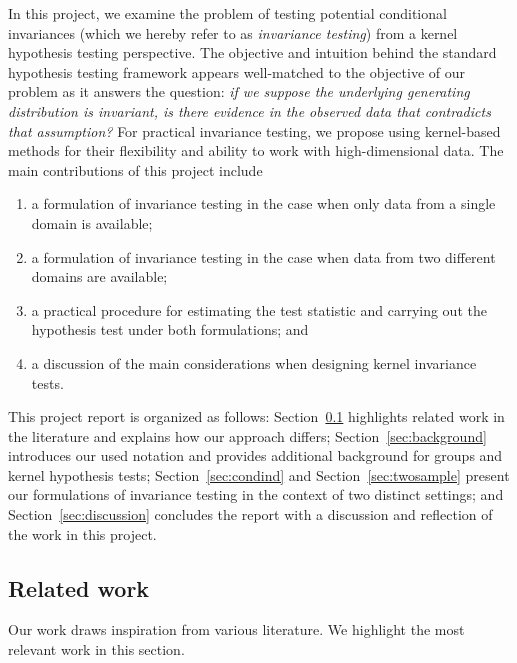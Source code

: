 In this project, we examine the problem of testing potential conditional invariances (which we hereby refer to as \textit{invariance testing}) from a kernel hypothesis testing perspective. The objective and intuition behind the standard hypothesis testing framework appears well-matched to the objective of our problem as it answers the question: \textit{if we suppose the underlying generating distribution is invariant, is there evidence in the observed data that contradicts that assumption?} For practical invariance testing, we propose using kernel-based methods for their flexibility and ability to work with high-dimensional data. The main contributions of this project include
\begin{enumerate}

\item
a formulation of invariance testing in the case when only data from a single domain is available;

\item
a formulation of invariance testing in the case when data from two different domains are available;

\item
a practical procedure for estimating the test statistic and carrying out the hypothesis test under both formulations; and

\item
a discussion of the main considerations when designing kernel invariance tests.

\end{enumerate}

This project report is organized as follows: Section~\ref{sec:related} highlights related work in the literature and explains how our approach differs; Section~\ref{sec:background} introduces our used notation and provides additional background for groups and kernel hypothesis tests; Section~\ref{sec:condind} and Section~\ref{sec:twosample} present our formulations of invariance testing in the context of two distinct settings; and Section~\ref{sec:discussion} concludes the report with a discussion and reflection of the work in this project.


\subsection{Related work}\label{sec:related}

Our work draws inspiration from various literature. We highlight the most relevant work in this section.
\\

